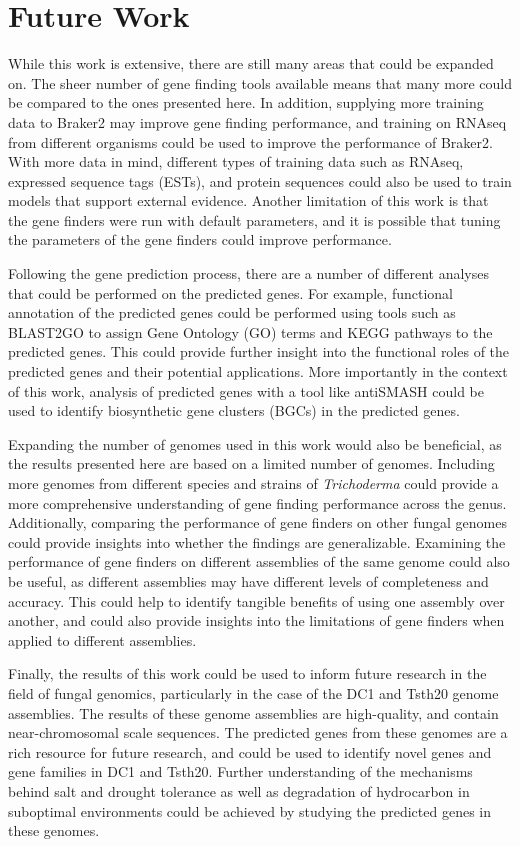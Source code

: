 \section{Future Work}

While this work is extensive, there are still many areas that could be
expanded on. The sheer number of gene finding tools available means
that many more could be compared to the ones presented here. In
addition, supplying more training data to Braker2 may improve gene
finding performance, and training on RNAseq from different organisms
could be used to improve the performance of Braker2. With more data in mind, different types of training data such as RNAseq,
expressed sequence tags (ESTs), and protein sequences could also be
used to train models that support external evidence. Another
limitation of this work is that the gene finders were run with default
parameters, and it is possible that tuning the parameters of the gene
finders could improve performance.

Following the gene prediction process, there are a number of different
analyses that could be performed on the predicted genes. For example,
functional annotation of the predicted genes could be performed using
tools such as BLAST2GO to assign Gene Ontology (GO) terms and KEGG
pathways to the predicted genes. This could provide further insight
into the functional roles of the predicted genes and their potential
applications. More importantly in the context of this work, analysis
of predicted genes with a tool like antiSMASH could be used to
identify biosynthetic gene clusters (BGCs) in the predicted genes.

Expanding the number of genomes used in this work would also be
beneficial, as the results presented here are based on a limited
number of genomes. Including more genomes from different species and
strains of \textit{Trichoderma} could provide a more comprehensive
understanding of gene finding performance across the
genus. Additionally, comparing the performance of gene finders on
other fungal genomes could provide insights into whether the findings
are generalizable. Examining the performance of gene finders on
different assemblies of the same genome could also be useful, as
different assemblies may have different levels of completeness and
accuracy. This could help to identify tangible benefits of using one
assembly over another, and could also provide insights into the
limitations of gene finders when applied to different assemblies.

Finally, the results of this work could be used to inform future
research in the field of fungal genomics, particularly in the case of
the DC1 and Tsth20 genome assemblies. The results of these genome
assemblies are high-quality, and contain near-chromosomal scale
sequences. The predicted genes from these genomes are a rich resource
for future research, and could be used to identify novel genes and
gene families in DC1 and Tsth20. Further understanding of the
mechanisms behind salt and drought tolerance as well as degradation of
hydrocarbon in suboptimal environments could be achieved by studying
the predicted genes in these genomes.
